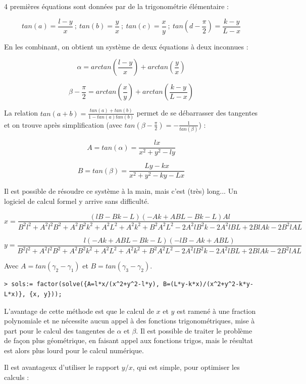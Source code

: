 \documentclass[a4paper]{article}
\begin{document}
4 premières équations sont données par de la trigonométrie élémentaire :

\[tan(a)=\frac{l-y}{x}\ ;\ tan(b)=\frac{y}{x}\ ;\ tan(c)=\frac{x}{y}\ ;\ tan(d-\frac{\pi}{2})=\frac{k-y}{L-x}\]

En les combinant, on obtient un système de deux équations à deux inconnues :

\[\alpha{}=arctan\left(\frac{l-y}{x}\right)+arctan\left(\frac{y}{x}\right)\]

\[\beta{}-\frac{\pi}{2}=arctan\left(\frac{x}{y}\right)+arctan\left(\frac{k-y}{L-x}\right)\]

La relation $tan(a+b)=\frac{tan(a)+tan(b)}{1-tan(a) tan(b)}$ permet de se débarrasser des tangentes et on trouve après simplification (avec $tan(\beta{}-\frac{\pi}{2})=-\frac{1}{tan(\beta{})}$) :

\[A=tan(\alpha{})=\frac{l x}{x^{2}+y^{2}-l y}\]

\[B=tan(\beta{})=\frac{L y-k x}{x^{2}+y^{2}-k y-L x}\]

Il est possible de résoudre ce système à la main, mais c'est (très) long... Un logiciel de calcul formel y arrive sans difficulté.

\[x = \frac{(l B-B k-L) (-A k+A B L-B k-L) A l}{B^{2} l^{2}+A^{2} l^{2} B^{2}+A^{2} B^{2} k^{2}+A^{2} L^{2}+A^{2} k^{2}+B^{2} A^{2} L^{2}-2 A^{2} l B^{2} k-2 A^{2} l B L+2 B l A k-2 B^{2} l A L}\]

\[y = \frac{l (-A k+A B L-B k-L) (-l B-A k+A B L)}{B^{2} l^{2}+A^{2} l^{2} B^{2}+A^{2} B^{2} k^{2}+A^{2} L^{2}+A^{2} k^{2}+B^{2} A^{2} L^{2}-2 A^{2} l B^{2} k-2 A^{2} l B L+2 B l A k-2 B^{2} l A L}\]

Avec $A=tan(\gamma_{2}-\gamma_{1})$ et $B=tan(\gamma_{3}-\gamma_{2})$.

\begin{lstlisting}[caption=Résolution du système avec Maple 9, label=Resolution_du_systeme_avec_Maple]
> sols:= factor(solve({A=l*x/(x^2+y^2-l*y), B=(L*y-k*x)/(x^2+y^2-k*y-L*x)}, {x, y}));
\end{lstlisting}

L'avantage de cette méthode est que le calcul de $x$ et $y$ est ramené à une fraction polynomiale et ne nécessite aucun appel à des fonctions trigonométriques, mise à part pour le calcul des tangentes de $\alpha$ et $\beta$. Il est possible de traiter le problème de façon plus géométrique, en faisant appel aux fonctions trigos, mais le résultat est alors plus lourd pour le calcul numérique.

Il est avantageux d'utiliser le rapport $y/x$, qui est simple, pour optimiser les calculs :
\end{document}
